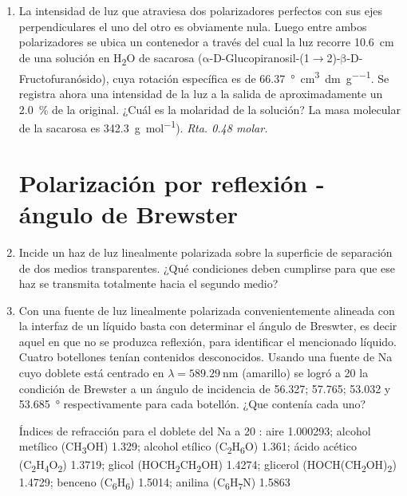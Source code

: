 \documentclass[11pt,spanish,a4paper,twoside]{article}
\begin{document}
\begin{enumerate}
\item
La intensidad de luz que atraviesa dos polarizadores perfectos con sus ejes perpendiculares el uno del otro es obviamente nula.
Luego entre ambos polarizadores se ubica un contenedor a través del cual la luz recorre \SI{10,6}{\centi\metre} de una solución en H\textsubscript{2}O de sacarosa (\(\mathrm{\alpha}\)-D-Glucopiranosil-(1\(\rightarrow\)2)-\(\mathrm{\beta}\)-D-Fructofuranósido), cuya rotación específica es de \SI{+66,37}{\degree\cubic\centi\metre\per\deci\metre\per\gram}.
Se registra ahora una intensidad de la luz a la salida de aproximadamente un \SI{2,0}{\percent} de la original.
¿Cuál es la molaridad de la solución? 
La masa molecular de la sacarosa es \SI{342,3}{\gram\per\mole}).
\textit{Rta. \num{0,48} molar.}



\section*{Polarización por reflexión - ángulo de Brewster}

\item
Incide un haz de luz linealmente polarizada sobre la superficie de separación de dos medios transparentes.
¿Qué condiciones deben cumplirse para que ese haz se transmita totalmente hacia el segundo medio?


\item
Con una fuente de luz linealmente polarizada convenientemente alineada con la interfaz de un líquido basta con determinar el ángulo de Breswter, es decir aquel en que no se produzca reflexión, para identificar el mencionado líquido.
Cuatro botellones tenían contenidos desconocidos.
Usando una fuente de Na cuyo doblete está centrado en \(\lambda= \SI{589.29}{\nano\metre}\) (amarillo) se logró a \SI{20}{\celcius} la condición de Brewster a un ángulo de incidencia de \num{56.327}; \num{57.765}; \num{53.032} y \SI{53.685}{\degree} respectivamente para cada botellón.
¿Que contenía cada uno?

Índices de refracción para el doblete del Na a \SI{20}{\celcius} : aire \num{1.000293}; alcohol metílico (CH\textsubscript{3}OH) \num{1.329}; alcohol etílico (C\textsubscript{2}H\textsubscript{6}O) \num{1.361}; ácido acético (C\textsubscript{2}H\textsubscript{4}O\textsubscript{2}) \num{1.3719}; glicol (HOCH\textsubscript{2}CH\textsubscript{2}OH) \num{1.4274}; glicerol (HOCH(CH\textsubscript{2}OH)\textsubscript{2}) \num{1.4729}; benceno (C\textsubscript{6}H\textsubscript{6}) \num{1.5014}; anilina (C\textsubscript{6}H\textsubscript{7}N) \num{1.5863} 



\end{enumerate}
\end{document}
